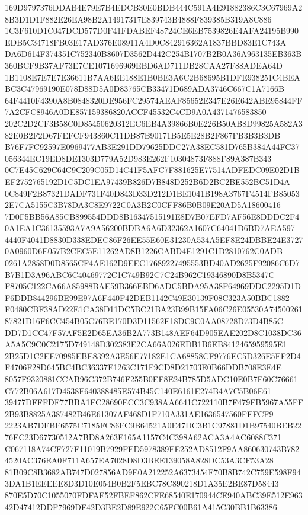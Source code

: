 \documentclass[UTF8,fontset=fandol,zihao=-4,a4paper]{ctexart}
\begin{document}
{{169D9797376DDAB4E79E7B4EDCB30E0BDB444C591A4E91882386C3C67969A28B3D1D1F882E26EA98B2A14917317E839743B4888F839385B319A8C886
1C3F610D1C047DCD577D0F41FDABEF48724CE6EB7539826E4AFA24195B990EDB5C34718FB03E17AD376E08911A4D0C842916362A1837BBD83E1C743A
DA6D614F374351C752340B8607D3562D442C254B1707B2B0A36A963135EB363B360BCF9B37AF73E7CE1071696969EBD6AD711DB28CAA27F88ADEA64D
1B1108E7E7E7E36611B7AA6EE188E1B0BE3A6C2B68695B1DFE938251C4BEABC3C47969190E078D88D5A0D83765CB33471D689ADA3746C667C1A7166B
64F4410F4390A8B0848320DE956FC29574AEAF85652E347E26E642ABE95844FF7A2CFC8946A0DE857159386820ACCF45532C4CD9A0A4371476583850
202C2D2CF3B58C0D85450620312EC6EB4A39866B0E226B50AB8D99825A582A382E0B2F2D67FEFCF943860C11DB87B90171B5E5E28B2F867FB3B3B3DB
B76F7FC92597E0969477AB3E291DD79625DDC27A38EC581D765B384A44FC37056344EC19ED8DE1303D779A52D983E262F10304873F888F89A387B343
0C7E45C629C64C9C209C05D14C41F5AFC7F881625E77514ADFEDC09E02D1BEF2752765192D1C5DC1EA97439B826D7B848D252B6D2BC2BE552BC51D4A
0C849F2B87321DADF731F40D843D33D212D1BE1041B198A3767F4514FB850532E7CA5155C3B78DA3C8E9722C0A3B2C0CFF86B0B09E20AD5A18600416
7D0F5BB56A85CB899554DDD8B16347515191E8D7B07EFD7AF56E8DDDC2F40A1EA1C36135593A7A9A56200BDBA6A6D32362A1607C64041D6BD7AEA597
4440F4041D8830D338EDEC86F26EE55E60E31230A534A5EF8E24DBBE24E37270A0960D6E057B2CEC5E11262AD8B1226CABD4E1291C1D2810762C0ADB
0261A2858D0D8565CF4AE162D9EEC17689227495553BD40AD2625F92086C6D7B7B1D3A96ABC6C40469772C1C749B92C7C24B962C19346890D8B5347C
F8705C122CA66A85988BAE59B366EBD6ADC5BDA95A38F64969DDC2295D1DF6DDB844296BE99E97A6F440F42DEB1142C49E30139F08C323A50BBC1882
F0480CBF38AD22E1CA38D11DC5BC21BA23B99B15FA06C26E05530A7450026187821D16F6CC454B05C76BE170D3D11562E18DC9C0AA08728D73D4B85C
DD7D1CC47F57AF5E2D65EA36B2A773B148AEF64D905EAE202D8C1038DC36A5A5C9C0C2175D749148D302383E2CA66A026EDB1B6EB8412465959595E1
2B25D1C2EE70985EBE8392A3E56E77182E1CA68858CF9776EC5D326E5FF2D4F4706F28D645BC4BC36337E1263C171F9CD8D21703E0B66DDB708E3E4E
8057F9320881CCAB96C372B746F255B0EF8E24B785D5ADC10E0B7F60C76661C772B06A617D4538F640388485E574B45C140E6161E274B4A7C5B06E61
39477DFFFDF77BBA1FC28690ECC3C938AA6641C722110B7F479FB5967A55FF2B93B8825A387482B46E61307AF468D1F710A331AE1636547560FEFCF9
2223AB7DFBF6575C7185FC86FC9B64521A0E47DC3B1C97881D1B97540BEB2276EC23D67730512A7BD8A263E165A1157C4C398A62ACA3A4AC6088C371
C067118A74CF727F11019B7929FED5978389FE252AD8512F9AA860630743B7824520AC376EA0F711A657EA7028D8D3BEE139058A828DC53A3CF53A28
81B09C8B3682AB747D027856AD9E0A212252A6373454F70B8B742C759E598F943DA1B1EEEEE8D3D10E054B0B2F5EBC78C890218D1A35E2BE87D58443
870E5D70C1055070FDFAF52FBEF862CFE68540E170944CE940ABC39E512E96342D47412DDF7969DF42D3BE2D89E922C65FC00B61A415C30BB1B63386
}}
\end{document}
